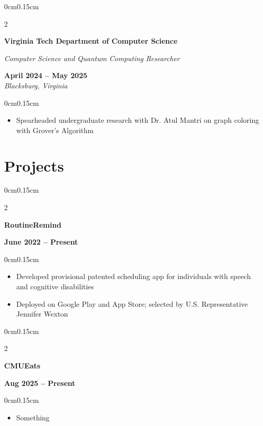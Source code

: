 \documentclass[10pt, letterpaper]{article}
\newenvironment{highlights}{
    \begin{itemize}[topsep=0pt, parsep=0pt, partopsep=0pt, itemsep=0pt, leftmargin=0.6cm]
}{
    \end{itemize}
}
\newenvironment{onecolentry}{
    \begin{adjustwidth}{0cm}{0.15cm}
}{
    \end{adjustwidth}
}
\newenvironment{twocolentry}[2][]{
    \onecolentry
    \def\secondColumn{#2}
    \setcolumnwidth{\fill, 4cm}
    \begin{paracol}{2}
}{
    \switchcolumn \raggedleft \secondColumn
    \end{paracol}
    \endonecolentry
}
\begin{document}
    \vspace{0.05cm}

    \begin{twocolentry}{\textbf{April 2024 -- May 2025} \\ \textit{Blacksburg, Virginia}}
        \textbf{Virginia Tech Department of Computer Science}
        
        \textit{Computer Science and Quantum Computing Researcher}
    \end{twocolentry}
    \vspace{-0.15cm}
    \begin{onecolentry}
        \begin{highlights}
            \item Spearheaded undergraduate research with Dr. Atul Mantri on graph coloring with Grover's Algorithm
        \end{highlights}
    \end{onecolentry}

    \vspace{0.05cm}

    \section{Projects}
    \vspace{0.1cm}

    \begin{twocolentry}{\textbf{June 2022 -- Present}}
        \textbf{RoutineRemind}
    \end{twocolentry}
    \vspace{-0.15cm}
    \begin{onecolentry}
        \begin{highlights}
            \item Developed provisional patented scheduling app for individuals with speech and cognitive disabilities
            \item Deployed on Google Play and App Store; selected by U.S. Representative Jennifer Wexton
        \end{highlights}
    \end{onecolentry}

    \vspace{0.05cm}

    \begin{twocolentry}{\textbf{Aug 2025 -- Present}}
        \textbf{CMUEats}
    \end{twocolentry}
    \vspace{-0.15cm}
    \begin{onecolentry}
        \begin{highlights}
            \item Something
        \end{highlights}
    \end{onecolentry}
\end{document}
